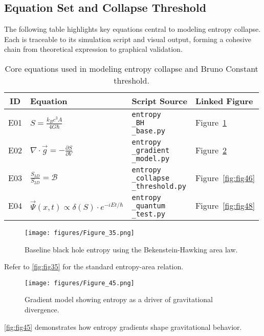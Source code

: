 \documentclass[12pt]{article}
\begin{document}
\subsection{Equation Set and Collapse Threshold}
The following table highlights key equations central to modeling entropy collapse. Each is traceable to its simulation script and visual output, forming a cohesive chain from theoretical expression to graphical validation.

\begin{table}[H]
\centering
\begin{tabular}{|c|l|l|l|}
\hline
\textbf{ID} & \textbf{Equation} & \textbf{Script Source} & \textbf{Linked Figure} \\
\hline
E01 & \( S = \frac{k_B c^3 A}{4 G \hbar} \) & \texttt{entropy\\_BH\\_base.py} & Figure~\ref{fig:fig35} \\
E02 & \( \nabla \cdot \vec{g} = -\frac{\partial S}{\partial V} \) & \texttt{entropy\\_gradient\\_model.py} & Figure~\ref{fig:fig45} \\
E03 & \( \frac{S_{3D}}{S_{2D}} = \mathcal{B} \) & \texttt{entropy\\_collapse\\_threshold.py} & Figure~\ref{fig:fig46} \\
E04 & \( \vec{\Psi}(x, t) \propto \delta(S) \cdot e^{-iEt/\hbar} \) & \texttt{entropy\\_quantum\\_test.py} & Figure~\ref{fig:fig48} \\
\hline
\end{tabular}
\caption{Core equations used in modeling entropy collapse and Bruno Constant threshold.}
\label{tab:equation-map}
\end{table}

\begin{figure}[H]
    \centering
    \texttt{[image: figures/Figure\_35.png]}
    \caption{Baseline black hole entropy using the Bekenstein-Hawking area law.}
    \label{fig:fig35}
\end{figure}
Refer to \autoref{fig:fig35} for the standard entropy-area relation.

\begin{figure}[H]
    \centering
    \texttt{[image: figures/Figure\_45.png]}
    \caption{Gradient model showing entropy as a driver of gravitational divergence.}
    \label{fig:fig45}
\end{figure}
\autoref{fig:fig45} demonstrates how entropy gradients shape gravitational behavior.
\end{document}
